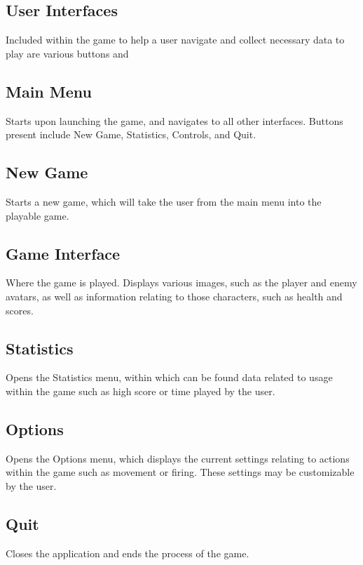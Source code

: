 \subsection*{User Interfaces}
    Included within the game to help a user navigate and collect
    necessary data to play are various buttons and

\subsection*{Main Menu}
    Starts upon launching the game, and navigates to all other
    interfaces. Buttons present include New Game, Statistics,
    Controls, and Quit.

\subsection*{New Game}
    Starts a new game, which will take the user from the main menu
    into the playable game.

\subsection*{Game Interface}
    Where the game is played. Displays various images, such as
    the player and enemy avatars, as well as information relating
    to those characters, such as health and scores.

\subsection*{Statistics}
    Opens the Statistics menu, within which can be found data related
    to usage within the game such as high score or time played by the
    user.

\subsection*{Options}
    Opens the Options menu, which displays the current settings
    relating to actions within the game such as movement or firing.
    These settings may be customizable by the user.

\subsection*{Quit}
    Closes the application and ends the process of the game.
